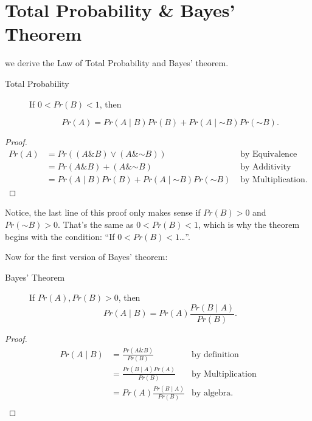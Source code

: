 \documentclass[justified]{tufte-book}
\newcommand{\given}{\mid}
\renewcommand{\neg}{\mathbin{\sim}}
\renewcommand{\wedge}{\mathbin{\&}}
\newcommand{\p}{Pr}
\theoremstyle{definition}
\theoremstyle{definition}
\theoremstyle{definition}
\theoremstyle{remark}
\let\BeginKnitrBlock\begin \let\EndKnitrBlock\end
\begin{document}
\hypertarget{total-probability-bayes-theorem}{%
\section*{Total Probability \& Bayes' Theorem}\label{total-probability-bayes-theorem}}

 we derive the Law of Total Probability and Bayes' theorem.

\begin{description}
\item[Total Probability]
If \(0 < \p(B) < 1\), then

\[ \p(A) = \p(A \given B)\p(B) + \p(A \given  \neg B)\p(\neg B). \]
\end{description}

\BeginKnitrBlock{proof}
{}
\[
  \begin{aligned}
    \p(A) &= \p((A \wedge B) \vee (A \wedge \neg B)) & \mbox{ by Equivalence}\\
          &= \p(A \wedge B) + (A \wedge \neg B) & \mbox{ by Additivity}\\
          &= \p(A \given B)\p(B) + \p(A \given \neg B)\p(\neg B) & \mbox{ by Multiplication.}
  \end{aligned}
\]
\EndKnitrBlock{proof}

Notice, the last line of this proof only makes sense if \(\p(B) > 0\) and \(\p(\neg B) > 0\). That's the same as \(0 < \p(B) < 1\), which is why the theorem begins with the condition: ``If \(0 < \p(B) < 1\)\ldots{}''.

Now for the first version of Bayes' theorem:

\begin{description}
\item[Bayes' Theorem]
If \(\p(A),\p(B)>0\), then
\[ \p(A \given B) = \p(A)\frac{\p(B \given A)}{\p(B)}. \]
\end{description}

\BeginKnitrBlock{proof}
{}
\[
  \begin{aligned}
    \p(A \given B) &= \frac{\p(A \wedge B)}{\p(B)} & \mbox{by definition}\\
              &= \frac{\p(B \given A)\p(A)}{\p(B)} & \mbox{by Multiplication}\\
              &= \p(A)\frac{\p(B \given A)}{\p(B)} & \mbox{by algebra.}\\
  \end{aligned}
\]
\EndKnitrBlock{proof}
\end{document}
